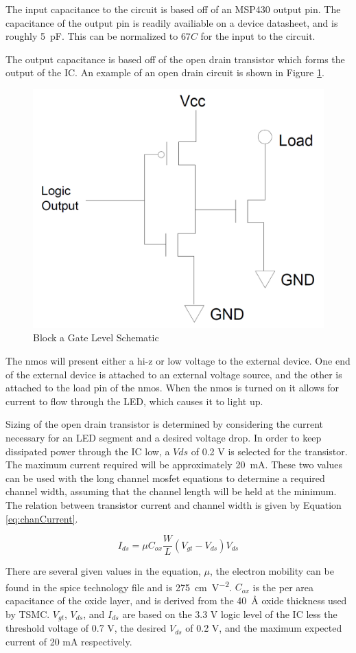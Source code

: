 \documentclass[12pt]{article}
\begin{document}
The input capacitance to the circuit is based off of an MSP430 output pin.
The capacitance of the output pin is readily availiable on a device datasheet, and is roughly \SI{5}{\pico\farad}.
This can be normalized to \(67C\) for the input to the circuit.

The output capacitance is based off of the open drain transistor which forms the output of the IC.
An example of an open drain circuit is shown in Figure \ref{fig:openCollector}.

\begin{figure}[H]
	\centering	
	\includegraphics[width=0.4\linewidth, keepaspectratio]{openCollector.png}
	\caption{Block a Gate Level Schematic}
	\label{fig:openCollector}
\end{figure}

The nmos will present either a hi-z or low voltage to the external device.
One end of the external device is attached to an external voltage source, and the other is attached to the load pin of the nmos.
When the nmos is turned on it allows for current to flow through the LED, which causes it to light up. 

Sizing of the open drain transistor is determined by considering the current necessary for an LED segment and a desired voltage drop.
In order to keep dissipated power through the IC low, a \(Vds\) of 0.2 V is selected for the transistor.
The maximum current required will be approximately \SI{20}{\milli\ampere}.
These two values can be used with the long channel mosfet equations to determine a required channel width, assuming that the channel length will be held at the minimum.
The relation between transistor current and channel width is given by Equation \eqref{eq:chanCurrent}.

\begin{equation}
\label{eq:chanCurrent}
 I_{ds} = \mu C_{ox} \frac{W}{L} (V_{gt} - V_{ds}) V_{ds}
\end{equation}

There are several given values in the equation, \(\mu\), the electron mobility can be found in the spice technology file and is \SI{275}{\centi\meter\per\volt\squared}.
\(C_{ox}\) is the per area capacitance of the oxide layer, and is derived from the \SI{40}{\angstrom} oxide thickness used by TSMC.
\(V_{gt}\), \(V_{ds}\), and \(I_{ds}\) are based on the 3.3 V logic level of the IC less the threshold voltage of 0.7 V, the desired \(V_{ds}\) of 0.2 V, and the maximum expected current of 20 mA respectively.
\end{document}
